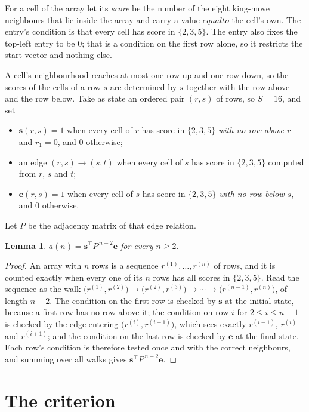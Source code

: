 \documentclass[11pt,a4paper]{article}
\theoremstyle{plain}
\newtheorem{lemma}[theorem]{Lemma}
\theoremstyle{definition}
\begin{document}
For a cell of the array let its \emph{score} be the number of the eight king-move neighbours that lie inside
the array and carry a value $equal to$ the cell's own. The entry's condition is that every cell
has score in $\{2,3,5\}$. The entry also fixes the top-left entry to be $0$; that is a condition on the first row alone, so it restricts the start vector and nothing else.

A cell's neighbourhood reaches at most one row up and one row down, so the scores of the
cells of a row $s$ are determined by $s$ together with the row above and the row below.
Take as state an ordered pair $(r,s)$ of rows, so $S=16$, and set
\begin{itemize}
\item $\mathbf{s}(r,s)=1$ when every cell of $r$ has score in $\{2,3,5\}$ \emph{with no row
above $r$} and $r_1=0$, and $0$ otherwise;
\item an edge $(r,s)\to(s,t)$ when every cell of $s$ has score in $\{2,3,5\}$ computed from
$r$, $s$ and $t$;
\item $\mathbf{e}(r,s)=1$ when every cell of $s$ has score in $\{2,3,5\}$ \emph{with no row
below $s$}, and $0$ otherwise.
\end{itemize}
Let $P$ be the adjacency matrix of that edge relation.

\begin{lemma}\label{lem:walk}
$a(n)=\mathbf{s}^{\!\top}P^{\,n-2}\mathbf{e}$ for every $n\ge2$.
\end{lemma}

\begin{proof}
An array with $n$ rows is a sequence $r^{(1)},\dots,r^{(n)}$ of rows, and it is counted
exactly when every one of its $n$ rows has all scores in $\{2,3,5\}$. Read the sequence as the
walk $\bigl(r^{(1)},r^{(2)}\bigr)\to\bigl(r^{(2)},r^{(3)}\bigr)\to\cdots\to
\bigl(r^{(n-1)},r^{(n)}\bigr)$, of length $n-2$. The condition on the first row is
checked by $\mathbf{s}$ at the initial state, because a first row has no row above it; the
condition on row $i$ for $2\le i\le n-1$ is checked by the edge entering
$\bigl(r^{(i)},r^{(i+1)}\bigr)$, which sees exactly $r^{(i-1)}$, $r^{(i)}$ and
$r^{(i+1)}$; and the condition on the last row is checked by $\mathbf{e}$ at the final
state. Each row's condition is therefore tested once and with the correct neighbours, and
summing over all walks gives $\mathbf{s}^{\!\top}P^{\,n-2}\mathbf{e}$.
\end{proof}

\section{The criterion}
\end{document}

